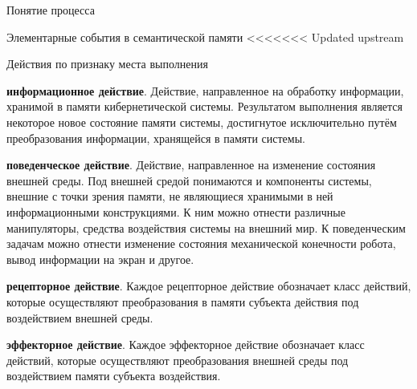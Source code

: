 \begin{frame}{\large Понятие процесса}
\begin{frame}{\large Элементарные события в семантической памяти}
<<<<<<< Updated upstream
\begin{frame}{Действия по признаку места выполнения}
    \begin{textitemize}
        \item \textbf{информационное действие}. Действие, направленное на обработку информации, хранимой в памяти кибернетической системы. Результатом выполнения является некоторое новое состояние памяти системы, достигнутое исключительно путём преобразования информации, хранящейся в памяти системы.
        \item \textbf{поведенческое действие}. Действие, направленное на изменение состояния внешней среды. Под внешней средой понимаются и компоненты системы, внешние с точки зрения памяти, не являющиеся хранимыми в ней информационными конструкциями. К ним можно отнести различные манипуляторы, средства воздействия системы на внешний мир. К поведенческим задачам можно отнести изменение состояния механической конечности робота, вывод информации на экран и другое.
    \end{textitemize}
\end{frame}
\begin{frame}{}
\begin{textitemize}
    \item \textbf{рецепторное действие}. Каждое рецепторное действие обозначает класс действий, которые осуществляют преобразования в памяти субъекта действия под воздействием внешней среды.
        \item \textbf{эффекторное действие}. Каждое эффекторное действие обозначает класс действий, которые осуществляют преобразования внешней среды под воздействием памяти субъекта воздействия.
\end{textitemize}
\end{frame}


\end{frame}
\end{frame}
